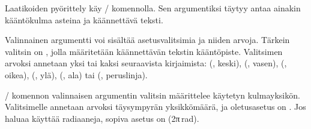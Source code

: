 Laatikoiden pyörittely käy \-/ komennolla. Sen
argumentiksi täytyy antaa ainakin kääntökulma asteina ja käännettävä
teksti.

\begin{koodilohkosis}
\end{koodilohkosis}

\noindent
Valinnainen argumentti  voi sisältää asetusvalitsimia
ja niiden arvoja. Tärkein valitsin on , jolla määritetään
käännettävän tekstin kääntöpiste. Valitsimen arvoksi annetaan yksi tai
kaksi seuraavista kirjaimista:  (, keski),
 (, vasen),  (, oikea),
 (, ylä),  (, ala) tai
 (, peruslinja).

\begin{koodilohkosis}
\end{koodilohkosis}

\begin{tulossis}
\end{tulossis}

\noindent
{}\-/ komennon valinnaisen argumentin valitsin
 määrittelee käytetyn kulmayksikön. Valitsimelle annetaan
arvoksi täysympyrän yksikkömäärä, ja oletusasetus on . Jos haluaa käyttää radiaaneja, sopiva asetus on
 (2π\,rad).
